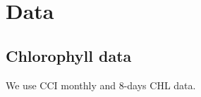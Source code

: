 \newcommand{\cov}{\text{cov}}

\newcommand{\0}{\mathbf{0}}

\newcommand{\C}{\mathbf{C}}
\newcommand{\X}{\mathbf{X}}
\newcommand{\U}{\mathbf{U}}
\renewcommand{\V}{\mathbf{V}}
\newcommand{\M}{\mathbf{M}}
\newcommand{\Q}{\mathbf{Q}}
\renewcommand{\H}{\mathbf{H}}
\newcommand{\I}{\mathbf{I}}
\newcommand{\R}{\mathbf{R}}
\renewcommand{\P}{\mathbf{P}}
\renewcommand{\L}{\mathbf{L}}

\renewcommand{\a}{\mathbf{a}}
\newcommand{\h}{\mathbf{h}}
\renewcommand{\r}{\mathbf{r}}
\newcommand{\x}{\mathbf{x}}
\renewcommand{\k}{\mathbf{k}}
\newcommand{\y}{\mathbf{y}}
\newcommand{\z}{\mathbf{z}}

\newcommand{\SSigma}{\mathbf{\Sigma}}
\newcommand{\GGamma}{\mathbf{\Gamma}}

\newcommand{\ttheta}{\boldsymbol\theta}
\newcommand{\eeta}{\boldsymbol\eta}
\newcommand{\vvarepsilon}{\boldsymbol\varepsilon}
\newcommand{\xxi}{\boldsymbol\xi}
\newcommand{\mmu}{\boldsymbol\mu}

\section{Data}

\subsection{Chlorophyll data}

We use CCI monthly and 8-days CHL data.

